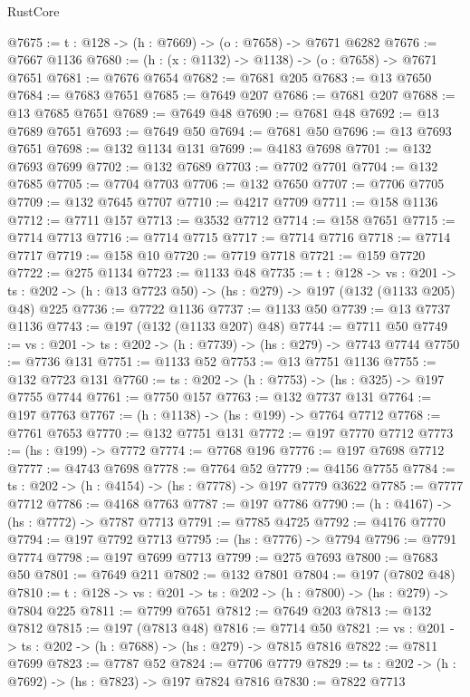 \begin{lexlean}{RustCore}
\begin{coremodule}
@7675 := {t : @128} -> (h : @7669) -> (o : @7658) -> @7671 @6282
@7676 := @7667 @1136
@7680 := (h : (x : @1132) -> @1138) -> (o : @7658) -> @7671 @7651
@7681 := @7676 @7654
@7682 := @7681 @205
@7683 := @13 @7650
@7684 := @7683 @7651
@7685 := @7649 @207
@7686 := @7681 @207
@7688 := @13 @7685 @7651
@7689 := @7649 @48
@7690 := @7681 @48
@7692 := @13 @7689 @7651
@7693 := @7649 @50
@7694 := @7681 @50
@7696 := @13 @7693 @7651
@7698 := @132 @1134 @131
@7699 := @4183 @7698
@7701 := @132 @7693 @7699
@7702 := @132 @7689
@7703 := @7702 @7701
@7704 := @132 @7685
@7705 := @7704 @7703
@7706 := @132 @7650
@7707 := @7706 @7705
@7709 := @132 @7645 @7707
@7710 := @4217 @7709
@7711 := @158 @1136
@7712 := @7711 @157
@7713 := @3532 @7712
@7714 := @158 @7651
@7715 := @7714 @7713
@7716 := @7714 @7715
@7717 := @7714 @7716
@7718 := @7714 @7717
@7719 := @158 @10
@7720 := @7719 @7718
@7721 := @159 @7720
@7722 := @275 @1134
@7723 := @1133 @48
@7735 := {t : @128} ->
  {vs : @201} ->
  {ts : @202} -> (h : @13 @7723 @50) -> (hs : @279) -> @197 (@132 (@1133 @205) @48) @225
@7736 := @7722 @1136
@7737 := @1133 @50
@7739 := @13 @7737 @1136
@7743 := @197 (@132 (@1133 @207) @48)
@7744 := @7711 @50
@7749 := {vs : @201} -> {ts : @202} -> (h : @7739) -> (hs : @279) -> @7743 @7744
@7750 := @7736 @131
@7751 := @1133 @52
@7753 := @13 @7751 @1136
@7755 := @132 @7723 @131
@7760 := {ts : @202} -> (h : @7753) -> (hs : @325) -> @197 @7755 @7744
@7761 := @7750 @157
@7763 := @132 @7737 @131
@7764 := @197 @7763
@7767 := (h : @1138) -> (hs : @199) -> @7764 @7712
@7768 := @7761 @7653
@7770 := @132 @7751 @131
@7772 := @197 @7770 @7712
@7773 := (hs : @199) -> @7772
@7774 := @7768 @196
@7776 := @197 @7698 @7712
@7777 := @4743 @7698
@7778 := @7764 @52
@7779 := @4156 @7755
@7784 := {ts : @202} -> (h : @4154) -> (hs : @7778) -> @197 @7779 @3622
@7785 := @7777 @7712
@7786 := @4168 @7763
@7787 := @197 @7786
@7790 := (h : @4167) -> (hs : @7772) -> @7787 @7713
@7791 := @7785 @4725
@7792 := @4176 @7770
@7794 := @197 @7792 @7713
@7795 := (hs : @7776) -> @7794
@7796 := @7791 @7774
@7798 := @197 @7699 @7713
@7799 := @275 @7693
@7800 := @7683 @50
@7801 := @7649 @211
@7802 := @132 @7801
@7804 := @197 (@7802 @48)
@7810 := {t : @128} -> {vs : @201} -> {ts : @202} -> (h : @7800) -> (hs : @279) -> @7804 @225
@7811 := @7799 @7651
@7812 := @7649 @203
@7813 := @132 @7812
@7815 := @197 (@7813 @48)
@7816 := @7714 @50
@7821 := {vs : @201} -> {ts : @202} -> (h : @7688) -> (hs : @279) -> @7815 @7816
@7822 := @7811 @7699
@7823 := @7787 @52
@7824 := @7706 @7779
@7829 := {ts : @202} -> (h : @7692) -> (hs : @7823) -> @197 @7824 @7816
@7830 := @7822 @7713

\end{coremodule}
\end{lexlean}
